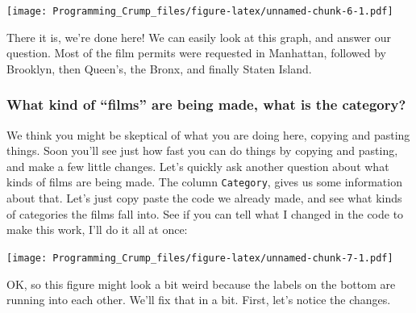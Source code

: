 \documentclass[]{book}
\newenvironment{Shaded}{\begin{snugshade}}{\end{snugshade}}
\newcommand{\KeywordTok}[1]{\textcolor[rgb]{0.13,0.29,0.53}{\textbf{{#1}}}}
\newcommand{\DataTypeTok}[1]{\textcolor[rgb]{0.13,0.29,0.53}{{#1}}}
\newcommand{\DecValTok}[1]{\textcolor[rgb]{0.00,0.00,0.81}{{#1}}}
\newcommand{\StringTok}[1]{\textcolor[rgb]{0.31,0.60,0.02}{{#1}}}
\newcommand{\NormalTok}[1]{{#1}}
\theoremstyle{definition}
\theoremstyle{definition}
\theoremstyle{definition}
\theoremstyle{remark}
\begin{document}
\texttt{[image: Programming\_Crump\_files/figure-latex/unnamed-chunk-6-1.pdf]}

There it is, we're done here! We can easily look at this graph, and
answer our question. Most of the film permits were requested in
Manhattan, followed by Brooklyn, then Queen's, the Bronx, and finally
Staten Island.

\subsubsection{\texorpdfstring{What kind of ``films'' are being made,
what is the
category?}{What kind of films are being made, what is the category?}}\label{what-kind-of-films-are-being-made-what-is-the-category}

We think you might be skeptical of what you are doing here, copying and
pasting things. Soon you'll see just how fast you can do things by
copying and pasting, and make a few little changes. Let's quickly ask
another question about what kinds of films are being made. The column
\texttt{Category}, gives us some information about that. Let's just copy
paste the code we already made, and see what kinds of categories the
films fall into. See if you can tell what I changed in the code to make
this work, I'll do it all at once:

\begin{Shaded}
\end{Shaded}

\texttt{[image: Programming\_Crump\_files/figure-latex/unnamed-chunk-7-1.pdf]}

OK, so this figure might look a bit weird because the labels on the
bottom are running into each other. We'll fix that in a bit. First,
let's notice the changes.
\end{document}
